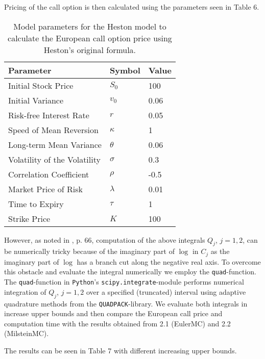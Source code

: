 \documentclass[12pt]{article}
\numberwithin{equation}{section}
\begin{document}
Pricing of the call option is then calculated using the parameters
seen in
Table 6.
\begin{table}[!h]
    \centering
    \begin{tabular}{lll}
    \toprule
    \textbf{Parameter} & \textbf{Symbol} & \textbf{Value} \\
    \midrule
    Initial Stock Price & $S_0$ & 100 \\
    Initial Variance & $v_0$ & 0.06 \\
    Risk-free Interest Rate & $r$ & 0.05 \\
    Speed of Mean Reversion & $\kappa$ & 1 \\
    Long-term Mean Variance & $\theta$ & 0.06 \\
    Volatility of the Volatility & $\sigma$ & 0.3 \\
    Correlation Coefficient & $\rho$ & -0.5 \\
    Market Price of Risk & $\lambda$ & 0.01 \\
    Time to Expiry & $\tau$ & 1 \\
    Strike Price & $K$ & 100 \\
    \bottomrule
    \end{tabular}
    \caption{Model parameters for the Heston model to calculate the European call option price using Heston's original formula.}
    \label{table:call_option_pricing_parameters3}
    \end{table}

However, as noted in \cite{Havrylenko2024}, p. 66, computation of the above
integrals $Q_j$, $j=1,2$, can be numerically tricky because of the imaginary
part of $\log$ in
$C_j$ as the imaginary part of $\log$ has a branch cut along the negative real
axis. To overcome this obstacle and evaluate the integral numerically
we employ the \texttt{quad}-function. The \texttt{quad}-function in
\texttt{Python}'s \texttt{scipy.integrate}-module \cite{2020SciPy-NMeth} performs numerical integration
of $Q_j$, $j=1,2$ over a specified (truncated) interval  using adaptive quadrature methods
from the \texttt{QUADPACK}-library. We evaluate both integrals in increase upper
bounds and then compare the European call price and computation time with the
results obtained from 2.1 (EulerMC) and 2.2 (MilsteinMC).

\newpage
The results can be seen in Table 7 with different increasing upper bounds.
\end{document}

